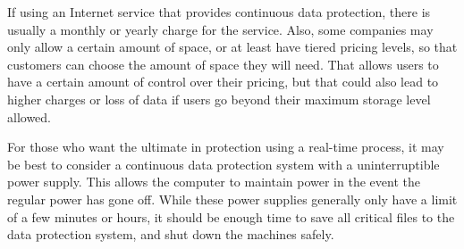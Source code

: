 If using an Internet service that provides continuous data protection, there is usually a monthly or yearly charge for the service. Also, some companies may only allow a certain amount of space, or at least have tiered pricing levels, so that customers can choose the amount of space they will need. That allows users to have a certain amount of control over their pricing, but that could also lead to higher charges or loss of data if users go beyond their maximum storage level allowed.

For those who want the ultimate in protection using a real-time process, it may be best to consider a continuous data protection system with a uninterruptible power supply. This allows the computer to maintain power in the event the regular power has gone off. While these power supplies generally only have a limit of a few minutes or hours, it should be enough time to save all critical files to the data protection system, and shut down the machines safely.

